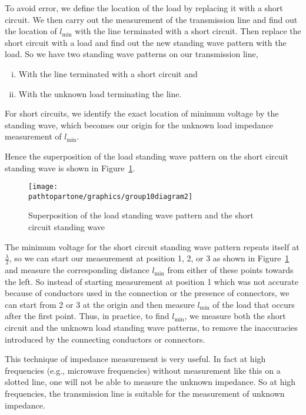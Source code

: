 To avoid error, we define the location of the load by replacing it with a short circuit. We then carry out the measurement of the transmission line and find out the location of $l_\min$ with the line terminated with a short circuit. Then replace the short circuit with a load and find out the new standing wave pattern with the load. So we have two standing wave patterns on our transmission line,
\begin{enumerate}[(i)]
\item With the line terminated with a short circuit and 
\item With the unknown load terminating the line.
\end{enumerate}
For short circuits, we identify the exact location of minimum voltage by the standing wave, which becomes our origin for the unknown load impedance measurement of $l_\min$.

Hence the superposition of the load standing wave pattern on the short circuit standing wave is shown in Figure~\ref{fig:group10diagram2}.
\begin{figure}[h]
\centering
\texttt{[image: \\pathtopartone/graphics/group10diagram2]}
\caption{Superposition of the load standing wave pattern and the short circuit standing wave}
\label{fig:group10diagram2}
\end{figure}

The minimum voltage for the short circuit standing wave pattern repeats itself at $\frac{\lambda}{2}$, so we can start our measurement at position 1, 2, or 3 as shown in Figure~\ref{fig:group10diagram2} and measure the corresponding distance $l_\min$ from either of these points towards the left. So instead of starting measurement at position 1 which was not accurate because of conductors used in the connection or the presence of connectors, we can start from 2 or 3 at the origin and then measure $l_\min$ of the load that occurs after the first point. Thus, in practice, to find $l_\min$, we measure both the short circuit and the unknown load standing wave patterns, to remove the inaccuracies introduced by the connecting conductors or connectors.

This technique of impedance measurement is very useful. In fact at high frequencies (e.g., microwave frequencies) without measurement like this on a slotted line, one will not be able to measure the unknown impedance. So at high frequencies, the transmission line is suitable for the measurement of unknown impedance.

